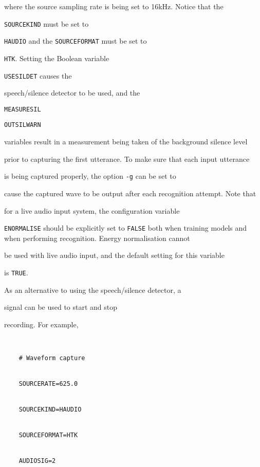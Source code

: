 where the source sampling rate is being set to 16kHz.  Notice that the


\texttt{SOURCEKIND} must be set to


\texttt{HAUDIO} and the \texttt{SOURCEFORMAT} must be set to 


\texttt{HTK}. Setting the Boolean variable 


\texttt{USESILDET} causes the


speech/silence detector to be used, and the


\texttt{MEASURESIL}


\texttt{OUTSILWARN} 


variables result in a measurement being taken of the background silence level


prior to capturing the first utterance.  To make sure that each input utterance


is being captured properly, the  option \texttt{-g} can be set to


cause the captured wave to be output after each recognition attempt. Note that


for a live audio input system, the configuration variable


\texttt{ENORMALISE} should be explicitly set to \texttt{FALSE} both when training models and when performing recognition. Energy normalisation cannot


be used with live audio input, and the default setting for this variable


is \texttt{TRUE}.





As an alternative to using the speech/silence detector, a


signal can be used to start and stop


recording.  For example,


\begin{verbatim}


    # Waveform capture


    SOURCERATE=625.0


    SOURCEKIND=HAUDIO


    SOURCEFORMAT=HTK


    AUDIOSIG=2


\end{verbatim}


